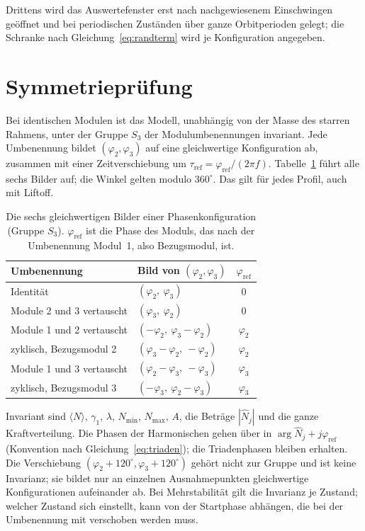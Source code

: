 \documentclass[12pt,a4paper]{report}
\begin{document}
Drittens wird das Auswertefenster erst nach nachgewiesenem Einschwingen
geöffnet und bei periodischen Zuständen über ganze Orbitperioden gelegt;
die Schranke nach Gleichung~\eqref{eq:randterm} wird je Konfiguration
angegeben.

\section{Symmetrieprüfung}
\label{sec:symmetrie}

Bei identischen Modulen ist das Modell, unabhängig von der Masse des
starren Rahmens, unter der Gruppe $S_3$ der Modulumbenennungen
invariant. Jede
Umbenennung bildet $(\varphi_2, \varphi_3)$ auf eine gleichwertige
Konfiguration ab, zusammen mit einer Zeitverschiebung um
$\tau_{\mathrm{ref}} = \varphi_{\mathrm{ref}}/(2\pi f)$.
Tabelle~\ref{tab:s3} führt alle sechs Bilder auf; die Winkel gelten
modulo $360^\circ$. Das gilt für jedes Profil, auch mit Liftoff.

\begin{table}[htbp]
  \centering
  \begin{tabular}{llc}
    \hline
    Umbenennung & Bild von $(\varphi_2, \varphi_3)$ & $\varphi_{\mathrm{ref}}$ \\
    \hline
    Identität                       & $(\varphi_2,\ \varphi_3)$              & $0$ \\
    Module 2 und 3 vertauscht       & $(\varphi_3,\ \varphi_2)$              & $0$ \\
    Module 1 und 2 vertauscht       & $(-\varphi_2,\ \varphi_3 - \varphi_2)$ & $\varphi_2$ \\
    zyklisch, Bezugsmodul 2         & $(\varphi_3 - \varphi_2,\ -\varphi_2)$ & $\varphi_2$ \\
    Module 1 und 3 vertauscht       & $(\varphi_2 - \varphi_3,\ -\varphi_3)$ & $\varphi_3$ \\
    zyklisch, Bezugsmodul 3         & $(-\varphi_3,\ \varphi_2 - \varphi_3)$ & $\varphi_3$ \\
    \hline
  \end{tabular}
  \caption{Die sechs gleichwertigen Bilder einer Phasenkonfiguration
  (Gruppe $S_3$). $\varphi_{\mathrm{ref}}$ ist die Phase des Moduls, das
  nach der Umbenennung Modul~1, also Bezugsmodul, ist.}
  \label{tab:s3}
\end{table}

Invariant sind $\langle N \rangle$, $\gamma_1$, $\lambda$, $N_{\min}$,
$N_{\max}$, $A$, die Beträge $|\hat{N}_j|$ und die ganze
Kraftverteilung. Die Phasen der Harmonischen gehen über in
$\arg\hat{N}_j + j\varphi_{\mathrm{ref}}$ (Konvention nach
Gleichung~\eqref{eq:triaden}); die Triadenphasen bleiben erhalten. Die
Verschiebung $(\varphi_2 + 120^\circ, \varphi_3 + 120^\circ)$ gehört nicht
zur Gruppe und ist keine Invarianz; sie bildet nur an einzelnen
Ausnahmepunkten gleichwertige Konfigurationen aufeinander ab. Bei
Mehrstabilität gilt die Invarianz je Zustand; welcher Zustand sich
einstellt, kann von der Startphase abhängen, die bei der Umbenennung mit
verschoben werden muss.
\end{document}
